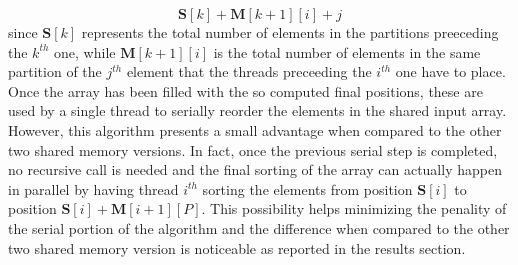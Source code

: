 \documentclass[../main.tex]{subfiles}
\begin{document}
\begin{equation*}
    \mathbf{S}[k] + \mathbf{M}[k+1][i] + j
\end{equation*}
since $\mathbf{S}[k]$ represents the total number of elements in the partitions preeceding the $k^{th}$ one, while $\mathbf{M}[k+1][i]$ is the total number of elements in the same partition of the $j^{th}$ element that the threads preceeding the $i^{th}$ one have to place.\\
Once the  array has been filled with the so computed final positions, these are used by a single thread to serially reorder the elements in the shared input array. However, this algorithm presents a small advantage when compared to the other two shared memory versions. In fact, once the previous serial step is completed, no recursive call is needed and the final sorting of the array can actually happen in parallel by having thread $i^{th}$ sorting the elements from position $\mathbf{S}[i]$ to position $\mathbf{S}[i]+\mathbf{M}[i+1][P]$. This possibility helps minimizing the penality of the serial portion of the algorithm and the difference when compared to the other two shared memory version is noticeable as reported in the results section.\\ 
\end{document}
